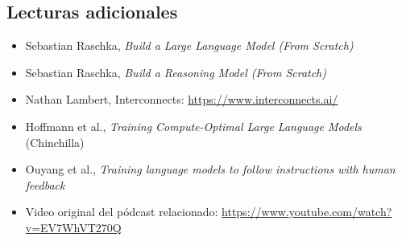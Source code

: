 \documentclass[a4paper]{article}
\begin{document}
\subsection{Lecturas adicionales}

\begin{itemize}[leftmargin=1.5em]
    \item Sebastian Raschka, \textit{Build a Large Language Model (From Scratch)}
    \item Sebastian Raschka, \textit{Build a Reasoning Model (From Scratch)}
    \item Nathan Lambert, Interconnects: \url{https://www.interconnects.ai/}
    \item Hoffmann et al., \textit{Training Compute-Optimal Large Language Models} (Chinchilla)
    \item Ouyang et al., \textit{Training language models to follow instructions with human feedback}
    \item Video original del pódcast relacionado: \url{https://www.youtube.com/watch?v=EV7WhVT270Q}
\end{itemize}
\end{document}
